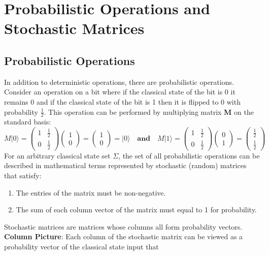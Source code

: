 \documentclass[11pt]{scrartcl}
\begin{document}
\section{Probabilistic Operations and Stochastic Matrices}
\subsection{Probabilistic Operations}
In addition to deterministic operations, there are probabilistic operations.
Consider an operation on a bit where if the classical state of the bit is 0 it remains 0 and if the classical state of the bit is 1
then it is flipped to 0 with probability $\frac{1}{2}$. This operation can be performed by multiplying matrix \textbf{M} on the standard basis:
$$M\vert 0 \rangle = \begin{pmatrix}1 & \frac{1}{2} \\ 0 & \frac{1}{2}\end{pmatrix}\begin{pmatrix}1 \\ 0\end{pmatrix} = \begin{pmatrix}1 \\ 0\end{pmatrix} = \vert 0 \rangle
\quad \textbf{and} \quad M\vert 1 \rangle = \begin{pmatrix}1 & \frac{1}{2} \\ 0 & \frac{1}{2}\end{pmatrix}\begin{pmatrix}0 \\ 1\end{pmatrix} = \begin{pmatrix}\frac{1}{2} \\ \frac{1}{2}\end{pmatrix}$$
For an arbitrary classical state set $\Sigma$, the set of all probabilistic operations can be described
in mathematical terms represented by stochastic (random) matrices that satisfy:
\begin{enumerate}
	\item The entries of the matrix must be non-negative.
	\item The sum of each column vector of the matrix must equal to 1 for probability.
\end{enumerate}
Stochastic matrices are matrices whose columns all form probability vectors.\vspace{2mm}
\newline
\textbf{Column Picture}: Each column of the stochastic matrix can be viewed as a probability vector of the classical state input that
\end{document}
